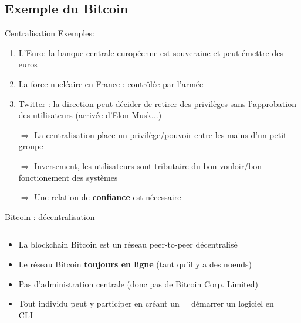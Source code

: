 \subsection{Exemple du Bitcoin}
\begin{frame}{Centralisation}
  Exemples:

  \begin{enumerate}
    \item L'Euro: la banque centrale européenne est souveraine et peut émettre des euros
    \item La force nucléaire en France : contrôlée par l'armée
    \item Twitter : la direction peut décider de retirer des privilèges sans l'approbation des utilisateurs (arrivée d'Elon Musk...)
  \end{enumerate}

  \begin{itemize}
    \item[$\Rightarrow$] La centralisation place un privilège/pouvoir entre les mains d'un petit groupe
    \item[$\Rightarrow$] Inversement, les utilisateurs sont tributaire du bon vouloir/bon fonctionement des systèmes
    \item[$\Rightarrow$] Une relation de \textbf{confiance} est nécessaire
  \end{itemize}
\end{frame}

\begin{frame}{Bitcoin : décentralisation}
  \begin{columns}
    \begin{column}{0.6\textwidth}
      \begin{itemize}
        \item La blockchain Bitcoin est un réseau peer-to-peer décentralisé
        \item Le réseau Bitcoin \textbf{toujours en ligne} (tant qu'il y a des noeuds)
        \item Pas d'administration centrale (donc pas de Bitcoin Corp. Limited)
        \item Tout individu peut y participer en créant un  = démarrer un logiciel en CLI
      \end{itemize}
    \end{column}

    \begin{column}{0.4\textwidth}
      
    \end{column}
  \end{columns}
\end{frame}


